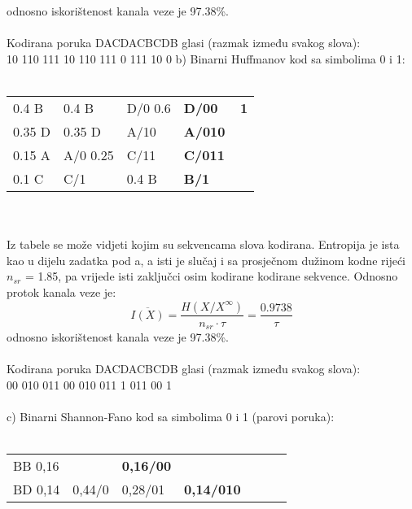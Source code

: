 \documentclass[12pt]{article}
\begin{document}
\begin{enumerate}
odnosno iskorištenost kanala veze je 97.38\%. \\
\\
Kodirana poruka DACDACBCDB glasi (razmak između svakog slova): \\
10 110 111 10 110 111 0 111 10 0 
		\newpage
b) Binarni Huffmanov kod sa simbolima 0 i 1:
\\
\\
\begin{tabular}{|l|l|l|l|}
\hline
0.4 B  & 0.4 B    & D/0 0.6 & \textbf{D/00~~~1} \\ \cline{1-2}
0.35 D & 0.35 D   & A/10    & \textbf{A/010}  \\ \cline{1-2}
0.15 A & A/0 0.25 & C/11    & \textbf{C/011}  \\ \cline{1-1} \cline{3-3}
0.1 C  & C/1      & 0.4 B   & \textbf{B/1}    \\ \hline
\end{tabular}	
\\
\\
Iz tabele se može vidjeti kojim su sekvencama slova kodirana. Entropija
je ista kao u dijelu zadatka pod a, a isti je slučaj i sa prosječnom
dužinom kodne rijeći $n_{sr}$ = 1.85, pa vrijede isti zaključci osim kodirane kodirane sekvence.
Odnosno protok kanala veze je:
\begin{equation*}
    \overline{I(X)} = \frac{H(X/X^\infty)}{n_{sr} \cdot \tau} = \frac{0.9738}{\tau}
\end{equation*}
odnosno iskorištenost kanala veze je 97.38\%. \\
\\
Kodirana poruka DACDACBCDB glasi (razmak između svakog slova): \\
00 010 011 00 010 011 1 011 00 1
\\
\\
c) Binarni Shannon-Fano kod sa simbolima 0 i 1 (parovi poruka): 
\\
\\
\begin{tabular}{|l|l|l|llll}
\cline{1-3}
BB 0,16   &        & \textbf{0,16/00} &                                          &                                           &                                            &                                             \\ \cline{1-1} \cline{3-4}
BD 0,14   & 0,44/0 & 0,28/01          & \multicolumn{1}{l|}{\textbf{0,14/010}}   &                                           &                                            &                                             \\ \cline{1-1} \cline{4-4}

\end{tabular}
\end{enumerate}
\end{document}
